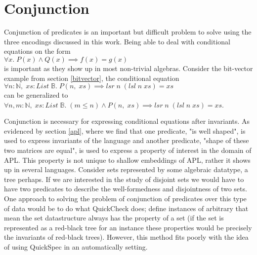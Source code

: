 \section{Conjunction}\label{conjunction}
Conjunction of predicates is an important
but difficult problem to solve using the three
encodings discussed in this work.
Being able to deal with conditional equations on the form
\\$\forall x.\;P(x)\wedge Q(x)\implies f(x)=g(x)$\\
is important as they show up in most non-trivial
algebras. Consider the bit-vector example from section
\ref{bitvector}, the conditional equation
\\$\forall n:\mathbb{N},\;xs:List\;\mathbb{B}.\;P(n,\;xs)\implies lsr\;n\;(lsl\;n\;xs)=xs$\\
can be generalized to
\\$\forall n,m:\mathbb{N},\;xs:List\;\mathbb{B}.\;(m\leq n)\wedge P(n,\;xs)\implies lsr\;n\;(lsl\;n\;xs)=xs$.

Conjunction is necessary for expressing conditional equations after invariants.
As evidenced by section \ref{apl}, where we find that one predicate, "is well shaped",
is used to express invariants of the language and another predicate, "shape of these two matrices
are equal", is used to express a property of interest in the domain of APL.
This property is not unique to shallow embeddings of APL, rather it shows up in several languages.
Consider sets represented by some algebraic datatype, a tree perhaps. If we are interested
in the study of disjoint sets we would have to have two predicates to describe the well-formedness
and disjointness of two sets. One approach to solving the problem of conjunction of predicates over this
type of data would be to do what QuickCheck does\cite{Claessen2000}; define instances
of arbitrary that mean the set datastructure always has the property of a set (if the set is represented
as a red-black tree for an instance these properties would be precisely the invariants of red-black trees). 
However, this method fits poorly with the idea of using QuickSpec in an automatically setting.

